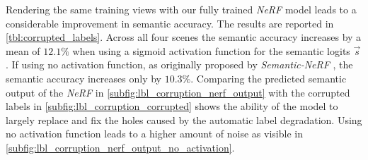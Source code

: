 Rendering the same training views with our fully trained \emph{NeRF} model leads to a considerable improvement in semantic accuracy. The results are reported in \cref{tbl:corrupted_labels}. 
Across all four scenes the semantic accuracy increases by a mean of $12.1\%$ when using a sigmoid activation function for the semantic logits $\vec{s}$. If using no activation function, as originally proposed by \emph{Semantic-NeRF} \cite{semanticnerf}, the semantic accuracy increases only by $10.3\%$.
Comparing the predicted semantic output of the \emph{NeRF} in \cref{subfig:lbl_corruption_nerf_output} with the corrupted labels in \cref{subfig:lbl_corruption_corrupted} shows the ability of the model to largely replace and fix the holes caused by the automatic label degradation. Using no activation function leads to a higher amount of noise as visible in \cref{subfig:lbl_corruption_nerf_output_no_activation}.















